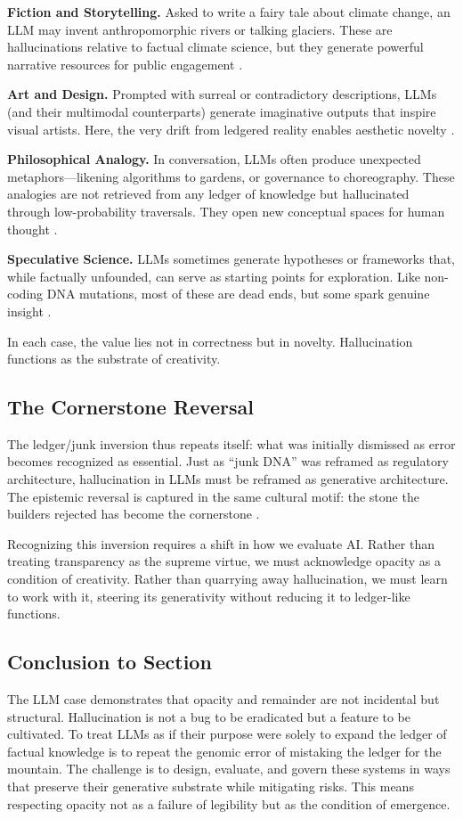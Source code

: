 \documentclass[12pt]{article}
\begin{document}
{{{\textbf{Fiction and Storytelling.} Asked to write a fairy tale about climate change, an LLM may invent anthropomorphic rivers or talking glaciers. These are hallucinations relative to factual climate science, but they generate powerful narrative resources for public engagement \citep{bender2021}.

\textbf{Art and Design.} Prompted with surreal or contradictory descriptions, LLMs (and their multimodal counterparts) generate imaginative outputs that inspire visual artists. Here, the very drift from ledgered reality enables aesthetic novelty \citep{manovich2020}.

\textbf{Philosophical Analogy.} In conversation, LLMs often produce unexpected metaphors---likening algorithms to gardens, or governance to choreography. These analogies are not retrieved from any ledger of knowledge but hallucinated through low-probability traversals. They open new conceptual spaces for human thought \citep{hofstadter1995}.

\textbf{Speculative Science.} LLMs sometimes generate hypotheses or frameworks that, while factually unfounded, can serve as starting points for exploration. Like non-coding DNA mutations, most of these are dead ends, but some spark genuine insight \citep{rheinberger1997}.

In each case, the value lies not in correctness but in novelty. Hallucination functions as the substrate of creativity.

\subsection{The Cornerstone Reversal}
The ledger/junk inversion thus repeats itself: what was initially dismissed as error becomes recognized as essential. Just as ``junk DNA'' was reframed as regulatory architecture, hallucination in LLMs must be reframed as generative architecture. The epistemic reversal is captured in the same cultural motif: the stone the builders rejected has become the cornerstone \citep{glissant1997}.

Recognizing this inversion requires a shift in how we evaluate AI. Rather than treating transparency as the supreme virtue, we must acknowledge opacity as a condition of creativity. Rather than quarrying away hallucination, we must learn to work with it, steering its generativity without reducing it to ledger-like functions.

\subsection{Conclusion to Section}
The LLM case demonstrates that opacity and remainder are not incidental but structural. Hallucination is not a bug to be eradicated but a feature to be cultivated. To treat LLMs as if their purpose were solely to expand the ledger of factual knowledge is to repeat the genomic error of mistaking the ledger for the mountain. The challenge is to design, evaluate, and govern these systems in ways that preserve their generative substrate while mitigating risks. This means respecting opacity not as a failure of legibility but as the condition of emergence.

}}}
\end{document}
